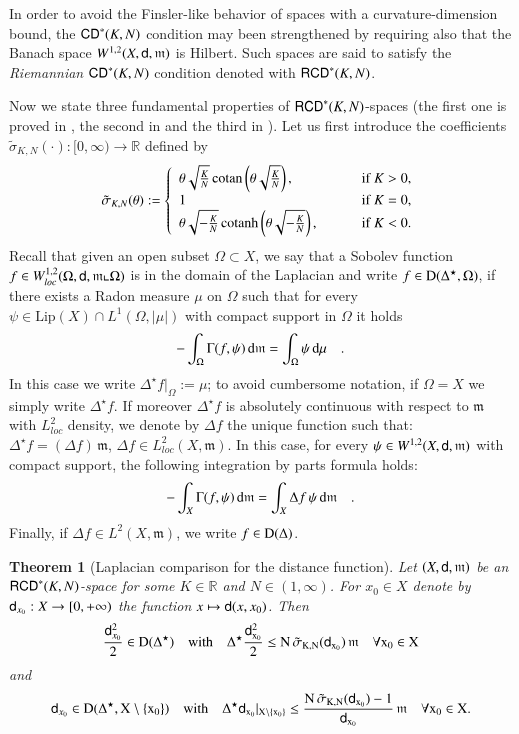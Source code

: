 \documentclass[11pt,reqno]{amsart}
\newcommand{\Lip}{\textrm{Lip}}
\newcommand{\dom}{\rm D}
\newcommand{\mm}{\mathfrak m}
\newcommand{\sfd}{{\sf d}}
\renewcommand{\d}{{\rm{d}}}
\newcommand{\R}{\mathbb{R}}
\newcommand{\CD}{{\sf CD}}
\newcommand{\RCD}{{\sf RCD}}
\newtheorem{theorem}{Theorem}[section]
\theoremstyle{definition}
\theoremstyle{remark}
\theoremstyle{remark}
\theoremstyle{remark}
\theoremstyle{remark}
\theoremstyle{remark}
\theoremstyle{remark}
\theoremstyle{remark}
\begin{document}
In order to avoid the Finsler-like behavior of spaces with a curvature-dimension bound, the $\CD^*(K,N)$ condition may been strengthened  by requiring also that the Banach space $W^{1,2}(X,\sfd,\mm)$ is Hilbert. Such spaces are said to satisfy the \emph{Riemannian $\CD^*(K,N)$} condition  denoted with $\RCD^*(K,N)$.

Now we state three fundamental properties of  $\RCD^*(K,N)$-spaces (the first one is proved in \cite{Gigli12}, the second in  \cite{GMS2013} and  the third in \cite{GigliSplitting}). Let us first introduce the coefficients $\tilde{\sigma}_{K,N}(\cdot):[0,\infty)\to\R$ defined by
 \[
\tilde{\sigma}_{K,N}(\theta):=\left\{
\begin{array}{ll}
\theta \sqrt{\frac{K}{N}} \, {\rm cotan} \left(\theta \sqrt{\frac{K}{N}} \right),&\qquad\textrm{ if }K>0,\\
1 &\qquad\textrm{ if }K=0 ,\\
\theta \sqrt{-\frac{K}{N}} \, {\rm cotanh} \left(\theta \sqrt{-\frac{K}{N}} \right),&\qquad\textrm{ if }K<0.
\end{array}
\right.
\]
Recall that given an open subset $\Omega\subset X$, we say that a Sobolev function $f \in W^{1,2}_{loc}(\Omega, \sfd, \mm\llcorner \Omega )$ is in the domain of the Laplacian and write $f \in \dom(\Delta^\star, \Omega)$, if there exists a Radon measure $\mu$ on $\Omega$ such that for every $\psi\in \Lip(X)\cap L^1(\Omega, |\mu|)$ with compact support in $\Omega$ it holds
$$-\int_{\Omega} \Gamma(f,\psi) \, \d \mm = \int_{\Omega} \psi \, \d \mu \quad. $$
In this case we write $\Delta^\star f |_{\Omega}:=\mu$; to avoid cumbersome notation, if $\Omega=X$ we simply write $\Delta^\star f$. If moreover $\Delta^\star f$ is absolutely continuous with respect to $\mm$ with $L^2_{loc}$ density, we denote by $\Delta f$ the unique function such that: $\Delta^\star f = (\Delta f) \, \mm$, $\Delta f \in L^2_{loc}(X,\mm)$. In this case,  for every $\psi \in W^{1,2}(X,\sfd,\mm)$ with compact support, the  following integration by parts formula holds:
$$-\int_{X} \Gamma(f,\psi) \, \d \mm= \int_{X} \Delta f \, \psi \, \d \mm \quad. $$
Finally, if $\Delta f \in L^{2}(X,\mm)$,  we write $f \in \dom(\Delta)$.

\begin{theorem}[Laplacian comparison for the distance function]\label{thm:LapComp}
Let $(X,\sfd,\mm)$ be an $\RCD^*(K,N)$-space for some $K\in \R$ and $N\in(1,\infty)$. For $x_0\in X$ denote by $\sfd_{x_0} : X \to [0,+\infty)$  the
function $x \mapsto \sfd(x, x_0)$. Then
$$\frac{\sfd^2_{x_0}}{2}\in \dom(\Delta^\star) \quad \text{with} \quad \Delta^\star \frac{\sfd^2_{x_0}}{2} \leq N\, \tilde{\sigma}_{K,N}(\sfd_{x_0}) \,\mm \quad \forall x_0 \in X  $$ 
and
$$\sfd_{x_0} \in \dom(\Delta^\star, X\setminus\{x_0\})  \quad \text{with} \quad \Delta^\star \sfd_{x_0} |_{X\setminus \{x_0\}}\leq \frac{ N \, \tilde{\sigma}_{K,N}(\sfd_{x_0})-1}{\sfd_{x_0}}\, \mm \quad \forall x_0 \in X.   $$
\end{theorem}
\end{document}
